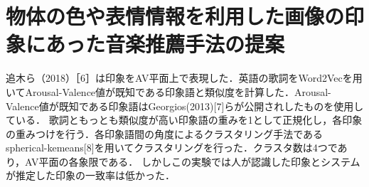 \section{物体の色や表情情報を利用した画像の印象にあった音楽推薦手法の提案}
追木ら（2018）［6］は印象をAV平面上で表現した．英語の歌詞をWord2Vecを用いてArousal-Valence値が既知である印象語と類似度を計算した．Arousal-Valence値が既知である印象語はGeorgios(2013)[7]らが公開されしたものを使用している．
歌詞ともっとも類似度が高い印象語の重みを1として正規化し，各印象の重みつけを行う．各印象語間の角度によるクラスタリング手法であるspherical-kemeans[8]を用いてクラスタリングを行った．クラスタ数は4つであり，AV平面の各象限である．
しかしこの実験では人が認識した印象とシステムが推定した印象の一致率は低かった．